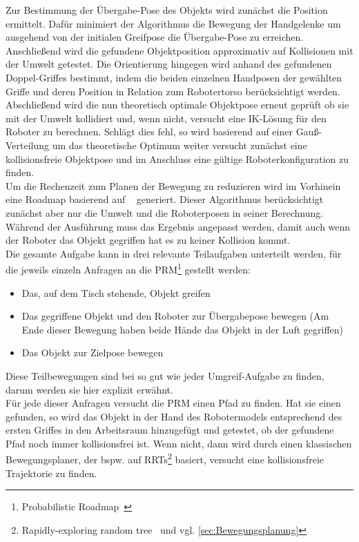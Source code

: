 Zur Bestimmung der Übergabe-Pose des Objekts wird zunächst die Position ermittelt. Dafür minimiert der Algorithmus die Bewegung der Handgelenke um ausgehend von der initialen Greifpose die Übergabe-Pose zu erreichen. Anschließend wird die gefundene Objektposition approximativ auf Kollisionen mit der Umwelt getestet. Die Orientierung hingegen wird anhand des gefundenen Doppel-Griffes bestimmt, indem die beiden einzelnen Handposen der gewählten Griffe und deren Position in Relation zum Robotertorso berücksichtigt werden. Abschließend wird die nun theoretisch optimale Objektpose erneut geprüft ob sie mit der Umwelt kollidiert und, wenn nicht, versucht eine IK-Lösung für den Roboter zu berechnen. Schlägt dies fehl, so wird basierend auf einer Gauß-Verteilung um das theoretische Optimum weiter versucht zunächst eine kollisionsfreie Objektpose und im Anschluss eine gültige Roboterkonfiguration zu finden.
\\

Um die Rechenzeit zum Planen der Bewegung zu reduzieren wird im Vorhinein eine \glqq Roadmap\grqq{} basierend auf ~\cite{gharbi2009roadmap} generiert. Dieser Algorithmus berücksichtigt zunächst aber nur die Umwelt und die Roboterposen in seiner Berechnung. Während der Ausführung muss das Ergebnis angepasst werden, damit auch wenn der Roboter das Objekt gegriffen hat es zu keiner Kollision kommt.\\
Die gesamte Aufgabe kann in drei relevante Teilaufgaben unterteilt werden, für die jeweils einzeln Anfragen an die PRM\footnote{\glqq Probabilistic Roadmap\grqq{}~\citep{kavraki1996probabilistic}} gestellt werden:
\begin{itemize}
\item Das, auf dem Tisch stehende, Objekt greifen
\item Das gegriffene Objekt und den Roboter zur Übergabepose bewegen (Am Ende dieser Bewegung haben beide Hände das Objekt in der Luft gegriffen)
\item Das Objekt zur Zielpose bewegen
\end{itemize}
Diese Teilbewegungen sind bei so gut wie jeder Umgreif-Aufgabe zu finden, darum werden sie hier explizit erwähnt.\\
Für jede dieser Anfragen versucht die PRM einen Pfad zu finden. Hat sie einen gefunden, so wird das Objekt in der Hand des Robotermodels entsprechend des ersten Griffes in den Arbeitsraum hinzugefügt und getestet, ob der gefundene Pfad noch immer kollisionsfrei ist. Wenn nicht, dann wird durch einen klassischen Bewegungsplaner, der bspw. auf RRTs\footnote{\glqq Rapidly-exploring random tree\grqq{}~\citep{lavalle2000rapidly} und vgl. \ref{sec:Bewegungsplanung}} basiert, versucht eine kollisionsfreie Trajektorie zu finden.
\\

